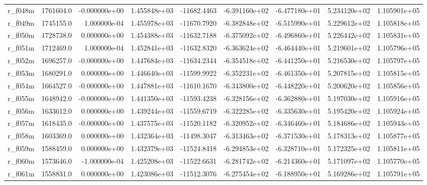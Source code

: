 \documentclass[10pt]{article}
\begin{document}
\begin{landscape}
\begin{longtable}{|l|r|r|r|r|r|r|r|r|}
r\_f048m                 &  1761604.0 & -0.000000e+00 &  1.455848e+03 & -11682.4463 & -6.391160e+02 & -6.477180e+01 &  5.234120e+02 &  1.105901e+05 \\
r\_f049m                 &  1745155.0 &  1.000000e-04 &  1.455978e+03 & -11670.7920 & -6.382848e+02 & -6.515990e+01 &  5.229612e+02 &  1.105818e+05 \\
r\_f050m                 &  1728738.0 &  0.000000e+00 &  1.454388e+03 & -11632.7188 & -6.375092e+02 & -6.496860e+01 &  5.226442e+02 &  1.105831e+05 \\
r\_f051m                 &  1712469.0 &  1.000000e-04 &  1.452841e+03 & -11632.8320 & -6.363624e+02 & -6.464440e+01 &  5.219601e+02 &  1.105796e+05 \\
r\_f052m                 &  1696257.0 & -0.000000e+00 &  1.447684e+03 & -11634.2344 & -6.354518e+02 & -6.441250e+01 &  5.216530e+02 &  1.105797e+05 \\
r\_f053m                 &  1680291.0 &  0.000000e+00 &  1.446640e+03 & -11599.9922 & -6.352231e+02 & -6.461350e+01 &  5.207815e+02 &  1.105815e+05 \\
r\_f054m                 &  1664527.0 & -0.000000e+00 &  1.447881e+03 & -11610.1670 & -6.343800e+02 & -6.448220e+01 &  5.200620e+02 &  1.105856e+05 \\
r\_f055m                 &  1648942.0 & -0.000000e+00 &  1.441350e+03 & -11593.4238 & -6.328156e+02 & -6.362880e+01 &  5.197030e+02 &  1.105916e+05 \\
r\_f056m                 &  1633612.0 &  0.000000e+00 &  1.439244e+03 & -11559.6719 & -6.322285e+02 & -6.335630e+01 &  5.195420e+02 &  1.105924e+05 \\
r\_f057m                 &  1618435.0 & -0.000000e+00 &  1.437575e+03 & -11520.1182 & -6.320952e+02 & -6.346460e+01 &  5.184686e+02 &  1.105943e+05 \\
r\_f058m                 &  1603369.0 &  0.000000e+00 &  1.432364e+03 & -11498.3047 & -6.313463e+02 & -6.371530e+01 &  5.178313e+02 &  1.105877e+05 \\
r\_f059m                 &  1588459.0 &  0.000000e+00 &  1.432379e+03 & -11524.8418 & -6.294853e+02 & -6.328710e+01 &  5.172325e+02 &  1.105811e+05 \\
r\_f060m                 &  1573646.0 & -1.000000e-04 &  1.425208e+03 & -11522.6631 & -6.281742e+02 & -6.214360e+01 &  5.171097e+02 &  1.105770e+05 \\
r\_f061m                 &  1558831.0 &  0.000000e+00 &  1.423086e+03 & -11512.3076 & -6.275454e+02 & -6.188950e+01 &  5.169286e+02 &  1.105791e+05 \\

\end{longtable}
\end{landscape}
\end{document}
